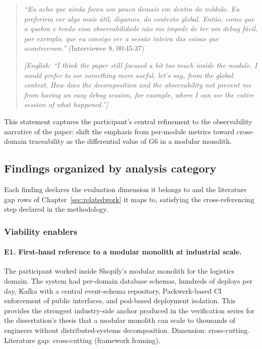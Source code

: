 \begin{quote}
\emph{``Eu acho que ainda focou um pouco demais em dentro do módulo. Eu preferiria ver algo mais útil, digamos, do contexto global. Então, como que a quebra e tendo essa observabilidade não me impede de ter um debug fácil, por exemplo, que eu consigo ver a sessão inteira das coisas que aconteceram.''} (Interviewee 8, 00:45:37)

\medskip

\emph{[English: ``I think the paper still focused a bit too much inside the module. I would prefer to see something more useful, let's say, from the global context. How does the decomposition and the observability not prevent me from having an easy debug session, for example, where I can see the entire session of what happened.'']}
\end{quote}

This statement captures the participant's central refinement to the observability narrative of the paper: shift the emphasis from per-module metrics toward cross-domain traceability as the differential value of G6 in a modular monolith.

\subsection*{Findings organized by analysis category}

Each finding declares the evaluation dimension it belongs to and the literature gap rows of Chapter~\ref{sec:relatedwork} it maps to, satisfying the cross-referencing step declared in the methodology.

\subsubsection*{Viability enablers}

\paragraph*{E1. First-hand reference to a modular monolith at industrial scale.} The participant worked inside Shopify's modular monolith for the logistics domain. The system had per-domain database schemas, hundreds of deploys per day, Kafka with a central event-schema repository, Packwerk-based CI enforcement of public interfaces, and pod-based deployment isolation. This provides the strongest industry-side anchor produced in the verification series for the dissertation's thesis that a modular monolith can scale to thousands of engineers without distributed-systems decomposition. Dimension: cross-cutting. Literature gap: cross-cutting (framework framing).

